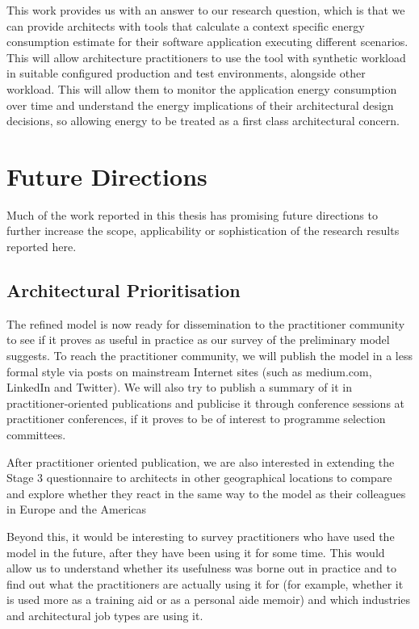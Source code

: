 This work provides us with an answer to our research question, which is that we can provide architects with tools that calculate a context specific energy consumption estimate for their software application executing different scenarios.  This will allow architecture practitioners to use the tool with synthetic workload in suitable configured production and test environments, alongside other workload.  This will allow them to monitor the application energy consumption over time and understand the energy implications of their architectural design decisions, so allowing energy to be treated as a first class architectural concern.

\section{Future Directions}

Much of the work reported in this thesis has promising future directions to further increase the scope, applicability or sophistication of the research results reported here.

\subsection{Architectural Prioritisation}

The refined model is now ready for dissemination to the practitioner community to see if it proves as useful in practice as our survey of the preliminary model suggests.  To reach the practitioner community, we will publish the model in a less formal style via posts on mainstream Internet sites (such as medium.com, LinkedIn and Twitter).  We will also try to publish a summary of it in practitioner-oriented publications and publicise it through conference sessions at practitioner conferences, if it proves to be of interest to programme selection committees.

After practitioner oriented publication, we are also interested in extending the Stage 3 questionnaire to architects in other geographical locations to compare and explore whether they react in the same way to the model as their colleagues in Europe and the Americas

Beyond this, it would be interesting to survey practitioners who have used the model in the future, after they have been using it for some time.  This would allow us to understand whether its usefulness was borne out in practice and to find out what the practitioners are actually using it for (for example, whether it is used more as a training aid or as a personal aide memoir) and which industries and architectural job types are using it.

